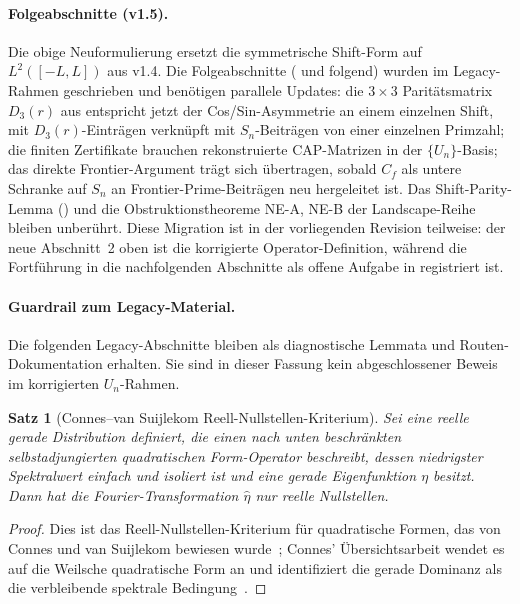 \documentclass[11pt,a4paper]{article}
\newtheorem{theorem}{Satz}[section]
\theoremstyle{remark}
\theoremstyle{plain}
\begin{document}
\paragraph{Folgeabschnitte (v1.5).} Die obige Neuformulierung ersetzt die symmetrische Shift-Form auf $L^2([-L,L])$ aus v1.4. Die Folgeabschnitte ( und folgend) wurden im Legacy-Rahmen geschrieben und benötigen parallele Updates: die $3\times 3$ Paritätsmatrix $D_3(r)$ aus  entspricht jetzt der Cos/Sin-Asymmetrie an einem einzelnen Shift, mit $D_3(r)$-Einträgen verknüpft mit $S_n$-Beiträgen von einer einzelnen Primzahl; die finiten Zertifikate brauchen rekonstruierte CAP-Matrizen in der $\{U_n\}$-Basis; das direkte Frontier-Argument trägt sich übertragen, sobald $C_f$ als untere Schranke auf $S_n$ an Frontier-Prime-Beiträgen neu hergeleitet ist. Das Shift-Parity-Lemma () und die Obstruktionstheoreme NE-A, NE-B der Landscape-Reihe bleiben unberührt. Diese Migration ist in der vorliegenden Revision teilweise: der neue Abschnitt~2 oben ist die korrigierte Operator-Definition, während die Fortführung in die nachfolgenden Abschnitte als offene Aufgabe in  registriert ist.

\paragraph{Guardrail zum Legacy-Material.}  Die folgenden Legacy-Abschnitte
bleiben als diagnostische Lemmata und Routen-Dokumentation erhalten. Sie sind
in dieser Fassung kein abgeschlossener Beweis im korrigierten $U_n$-Rahmen.

\begin{theorem}[Connes--van Suijlekom Reell-Nullstellen-Kriterium]
\label{thm:connes}
Sei eine reelle gerade Distribution definiert, die einen nach unten beschränkten selbstadjungierten quadratischen Form-Operator beschreibt, dessen niedrigster Spektralwert einfach und isoliert ist und eine gerade Eigenfunktion $\eta$ besitzt. Dann hat die Fourier-Transformation $\widehat\eta$ nur reelle Nullstellen.
\end{theorem}

\begin{proof}
Dies ist das Reell-Nullstellen-Kriterium für quadratische Formen, das von Connes und van Suijlekom bewiesen wurde~\cite{ConnesvS2025}; Connes' Übersichtsarbeit wendet es auf die Weilsche quadratische Form an und identifiziert die gerade Dominanz als die verbleibende spektrale Bedingung~\cite{Connes2026}.
\end{proof}
\end{document}
